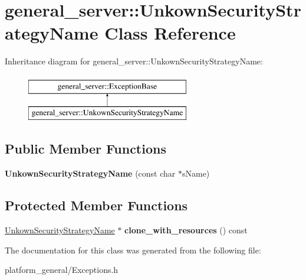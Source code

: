\hypertarget{classgeneral__server_1_1UnkownSecurityStrategyName}{\section{general\-\_\-server\-:\-:\-Unkown\-Security\-Strategy\-Name \-Class \-Reference}
\label{classgeneral__server_1_1UnkownSecurityStrategyName}
}
\-Inheritance diagram for general\-\_\-server\-:\-:\-Unkown\-Security\-Strategy\-Name\-:\begin{figure}[H]
\begin{center}
\leavevmode
\includegraphics[height=2.000000cm]{classgeneral__server_1_1UnkownSecurityStrategyName}
\end{center}
\end{figure}
\subsection*{\-Public \-Member \-Functions}
\begin{DoxyCompactItemize}
\item 
\hypertarget{classgeneral__server_1_1UnkownSecurityStrategyName_a4b43b750dca84bc0010a7dd3d156113e}{{\bfseries \-Unkown\-Security\-Strategy\-Name} (const char $\ast$s\-Name)}\label{classgeneral__server_1_1UnkownSecurityStrategyName_a4b43b750dca84bc0010a7dd3d156113e}

\end{DoxyCompactItemize}
\subsection*{\-Protected \-Member \-Functions}
\begin{DoxyCompactItemize}
\item 
\hypertarget{classgeneral__server_1_1UnkownSecurityStrategyName_a43eddb61f4a1e2338d5bc542c81b0bc7}{\hyperlink{classgeneral__server_1_1UnkownSecurityStrategyName}{\-Unkown\-Security\-Strategy\-Name} $\ast$ {\bfseries clone\-\_\-with\-\_\-resources} () const }\label{classgeneral__server_1_1UnkownSecurityStrategyName_a43eddb61f4a1e2338d5bc542c81b0bc7}

\end{DoxyCompactItemize}


\-The documentation for this class was generated from the following file\-:\begin{DoxyCompactItemize}
\item 
platform\-\_\-general/\-Exceptions.\-h\end{DoxyCompactItemize}
